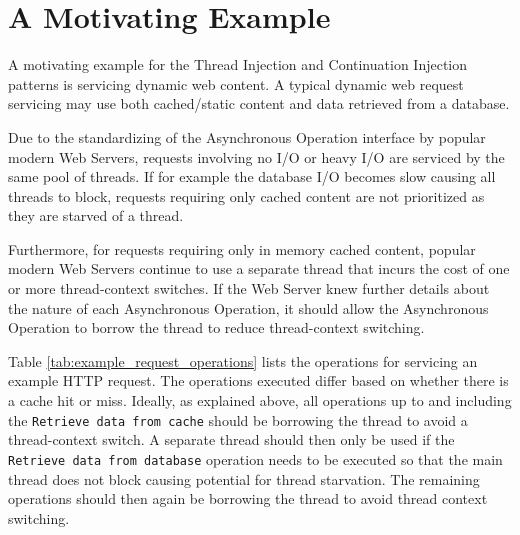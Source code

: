 \documentclass[prodmode]{style/acmlarge}
\begin{document}
\section{A Motivating Example}

A motivating example for the Thread Injection and Continuation Injection
patterns is servicing dynamic web content.  A typical dynamic web request
servicing may use both cached/static content and data retrieved from a database.

Due to the standardizing of the Asynchronous Operation interface by popular
modern Web Servers, requests involving no I/O or heavy I/O are serviced by the
same pool of threads.  If for example the database I/O becomes slow causing all
threads to block, requests requiring only cached content are not prioritized as
they are starved of a thread.

Furthermore, for requests requiring only in memory cached content, popular
modern Web Servers continue to use a separate thread that incurs the cost of one
or more thread-context switches.  If the Web Server knew further details about
the nature of each Asynchronous Operation, it should allow the Asynchronous
Operation to borrow the thread to reduce thread-context switching.

Table \ref{tab:example_request_operations} lists the operations for servicing an
example HTTP request.  The operations executed differ based on whether there is
a cache hit or miss.  Ideally, as explained above, all operations up to and
including the \texttt{Retrieve data from cache} should be borrowing the thread
to avoid a thread-context switch.  A separate thread should then only be used if
the \texttt{Retrieve data from database} operation needs to be executed so that
the main thread does not block causing potential for thread starvation.  The
remaining operations should then again be borrowing the thread to avoid thread
context switching.
\end{document}
